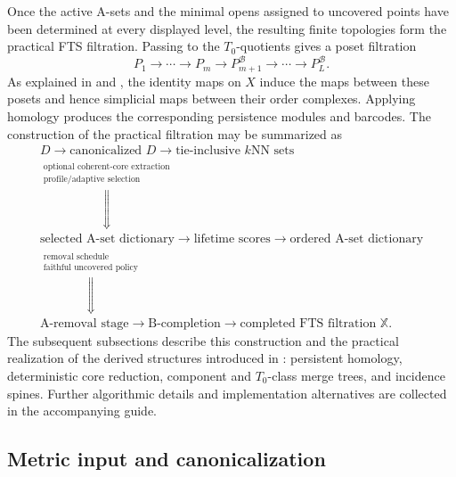 \documentclass[a4paper,11pt]{article}
\theoremstyle{definition}
\theoremstyle{remark}
\begin{document}
Once the active A-sets and the minimal opens assigned to uncovered points have been determined at every displayed level, the resulting finite topologies form the practical FTS filtration. Passing to the $T_0$-quotients gives a poset filtration
$$
P_1\longrightarrow\cdots\longrightarrow P_m
\longrightarrow
P_{m+1}^{\mathcal B}\longrightarrow\cdots\longrightarrow P_L^{\mathcal B}.
$$
As explained in  and , the identity maps on $X$ induce the maps between these posets and hence simplicial maps between their order complexes. Applying homology produces the corresponding persistence modules and barcodes. The construction of the practical filtration may be summarized as
$$
\boxed{
\begin{gathered}
D
\longrightarrow
\text{canonicalized }D
\longrightarrow
\text{tie-inclusive }k\text{NN sets}
\\[1mm]
\overset{\substack{\text{optional coherent-core extraction}\\
\text{profile/adaptive selection}}}{\Downarrow}
\\[-1mm]
\text{selected A-set dictionary}
\longrightarrow
\text{lifetime scores}
\longrightarrow
\text{ordered A-set dictionary}
\\[1mm]
\overset{\substack{\text{removal schedule}\\
\text{faithful uncovered policy}}}{\Downarrow}
\\[-1mm]
\text{A-removal stage}
\longrightarrow
\text{B-completion}
\longrightarrow
\text{completed FTS filtration }\mathbb X .
\end{gathered}
}
$$
The subsequent subsections describe this construction and the practical realization of the derived structures introduced in : persistent homology, deterministic core reduction, component and $T_0$-class merge trees, and incidence spines. Further algorithmic details and implementation alternatives are collected in the accompanying guide.


\subsection{Metric input and canonicalization}
\label{subsec:data-metric}
\end{document}
